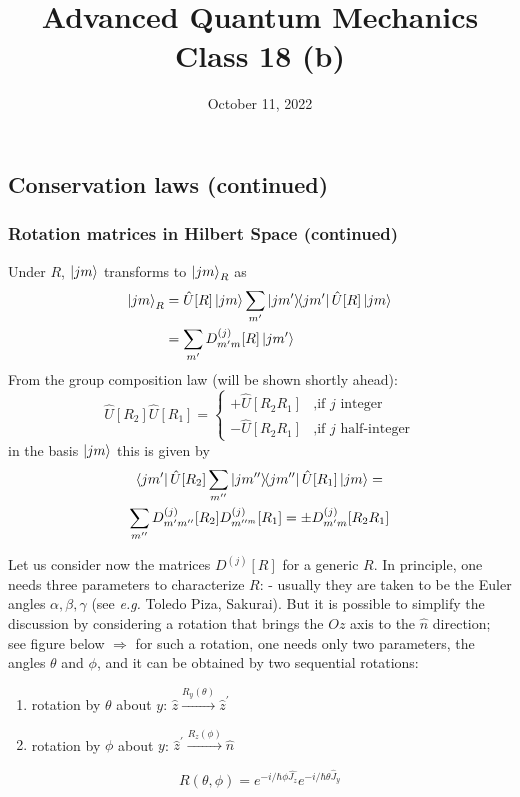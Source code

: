 \documentclass[12pt]{article}
\title{Advanced Quantum Mechanics\\Class 18 (b)}
\date{October 11, 2022}                                           %
\newcommand{\be}{\begin{equation}}
\newcommand{\ee}{\end{equation}}
\begin{document}
\maketitle

\subsection{Conservation laws (continued)}

\subsubsection{Rotation matrices in Hilbert Space (continued)}
 
Under $R$, $\ket{jm}$ transforms to $\ket{jm}_R$ as
\be
\begin{aligned}
\ket{jm}_{R} 
&=\hat{U}[R]\ket{jm}
\sum_{m^{\prime}} \op{jm^\prime} \hat{U}[R] \ket{jm}\\
&=\sum_{m^{\prime}} D^{(j)}_{m^\prime m}[R] \ket{jm^\prime}
\end{aligned}
\ee
From the group composition law (will be shown shortly ahead):
\be
\hat{U}[R_2]\hat{U}[R_1] =
\begin{cases}
+\hat{U}[R_2R_1]&\text{,if $j$ integer}\\
-\hat{U}[R_2R_1]&\text{,if $j$ half-integer}
\end{cases}
\ee
in the basis $\ket{jm}$ this is given by
\be
\begin{gathered}
\bra{jm^\prime}\hat{U}[R_2]
\sum_{m^{\prime\prime}}\op{jm^{\prime\prime}}
\hat{U}[R_1]\ket{jm}=\\
\sum_{m^{\prime\prime}} 
D^{(j)}_{m^\prime m^{\prime\prime}}[R_2]
D^{(j)}_{m^{\prime\prime m}}[R_1] =
\pm D^{(j)}_{m^\prime m}[R_2R_1]
\end{gathered}
\ee

Let us consider now the matrices \(D^{(j)}[R]\) for a generic \(R\).
In principle, one needs three parameters to characterize \(R\):
- usually they are taken to  be the Euler angles \(\alpha, \beta, \gamma\)
(see \textit{e.g.} Toledo Piza, Sakurai). But it is possible
to simplify the discussion by considering a rotation
that brings the \(Oz\) axis to the \(\hat{n}\) direction; see figure
below \(\Rightarrow\) for such a rotation, one needs only two
parameters, the angles \(\theta\) and \(\phi\), and it can be obtained
by two sequential rotations:
\begin{enumerate}
\item rotation by $\theta$ about $y$: \(\hat{z} \stackrel{R_{y}(\theta)}{\longrightarrow} \hat{z}^{\prime}\)
\item rotation by $\phi$   about $y$: \(\hat{z}^{\prime}\stackrel{R_{z}(\phi)}{\longrightarrow} \hat{n}\)
\end{enumerate}
\be
R(\theta, \phi)=e^{-i / \hbar \phi \hat{J_{z}}} e^{-i / \hbar \theta \hat{J}_{y}}
\ee
\end{document}
